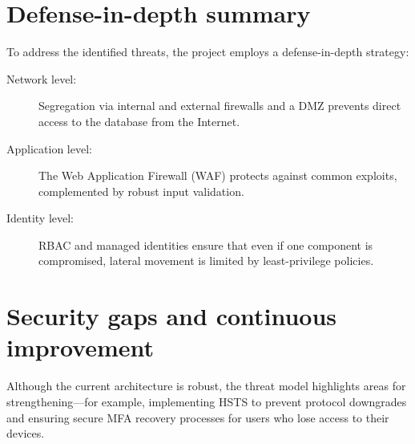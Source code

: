 \section{Defense-in-depth summary}

To address the identified threats, the project employs a defense-in-depth strategy:

\begin{description}
  \item[Network level:]
    Segregation via internal and external firewalls and a DMZ prevents direct access to the database from the Internet.
  \item[Application level:]
    The Web Application Firewall (WAF) protects against common exploits, complemented by robust input validation.
  \item[Identity level:]
    RBAC and managed identities ensure that even if one component is compromised, lateral movement is limited by least-privilege policies.
\end{description}

\section{Security gaps and continuous improvement}

Although the current architecture is robust, the threat model highlights areas for strengthening---for example, implementing HSTS to prevent protocol downgrades and ensuring secure MFA recovery processes for users who lose access to their devices.
